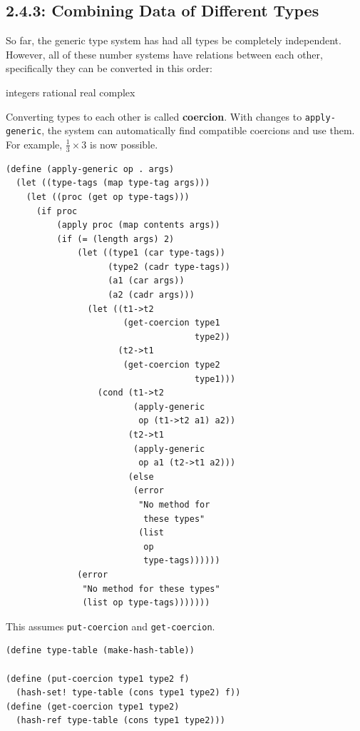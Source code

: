 \documentclass[final,fleqn,titlepage,twoside]{article}
\begin{document}
\subsection{2.4.3: Combining Data of Different Types}
\label{sec:orgbc3e7ae}
So far, the generic type system has had all types be completely independent.
However, all of these number systems have relations between each other,
specifically they can be converted in this order:

integers \rarrow rational \rarrow real \rarrow complex

Converting types to each other is called \textbf{\textbf{coercion}}. With changes to
\texttt{apply-generic}, the system can automatically find compatible
coercions and use them. For example, \(\frac{1}{3}\times3\) is now possible.

\begin{verbatim}
(define (apply-generic op . args)
  (let ((type-tags (map type-tag args)))
    (let ((proc (get op type-tags)))
      (if proc
          (apply proc (map contents args))
          (if (= (length args) 2)
              (let ((type1 (car type-tags))
                    (type2 (cadr type-tags))
                    (a1 (car args))
                    (a2 (cadr args)))
                (let ((t1->t2 
                       (get-coercion type1
                                     type2))
                      (t2->t1 
                       (get-coercion type2 
                                     type1)))
                  (cond (t1->t2
                         (apply-generic 
                          op (t1->t2 a1) a2))
                        (t2->t1
                         (apply-generic 
                          op a1 (t2->t1 a2)))
                        (else
                         (error 
                          "No method for 
                           these types"
                          (list 
                           op 
                           type-tags))))))
              (error 
               "No method for these types"
               (list op type-tags)))))))
\end{verbatim}

This assumes \texttt{put-coercion} and \texttt{get-coercion}.

\begin{verbatim}
(define type-table (make-hash-table))

(define (put-coercion type1 type2 f)
  (hash-set! type-table (cons type1 type2) f))
(define (get-coercion type1 type2)
  (hash-ref type-table (cons type1 type2)))
\end{verbatim}
\end{document}
